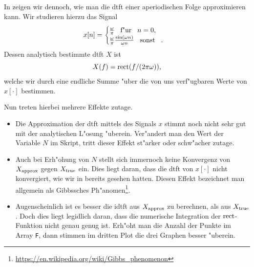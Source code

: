 In  zeigen wir dennoch, wie man die \gls{dtft} einer aperiodischen Folge approximieren kann.
Wir studieren hierzu das Signal
\[
x[n] = \begin{cases}
    \frac{\omega}{\pi} {\hspace{3mm} \text{f"ur} \hspace{3mm}} n = 0,\\
    \frac{\omega}{\pi} \frac{\sin(\omega n)}{\omega n} {\hspace{3mm} \text{sonst} \hspace{3mm}}.
\end{cases}
\]
Dessen analytisch bestimmte \gls{dtft} $X$ ist
\[
X(f) = \operatorname*{rect}(f/(2 \pi \omega)),
\]
welche wir durch eine endliche Summe "uber die von uns verf"ugbaren Werte von $x[\cdot]$ bestimmen.

Nun treten hierbei mehrere Effekte zutage.
%
\begin{itemize}
\item Die Approximation der \gls{dtft} mittels des  Signals $x$ stimmt noch nicht sehr gut mit der analytischen L"osung "uberein. 
Ver"andert man den Wert der Variable $N$ im Skript, tritt dieser Effekt st"arker oder schw"acher zutage.
\item Auch bei Erh"ohung von $N$ stellt sich immernoch keine Konvergenz von $X_{\rm approx}$ gegen $X_{\rm true}$ ein.
Dies liegt daran, dass die \gls{dtft} von $x[\cdot]$ nicht konvergiert, wie wir in  bereits gesehen hatten.
Diesen Effekt bezeichnet man allgemein als Gibbssches Ph"anomen\footnote{\url{https://en.wikipedia.org/wiki/Gibbs_phenomenon}}.
\item Augenscheinlich ist es besser die \gls{idtft} aus $X_{\rm approx}$ zu berechnen, als aus $X_{\rm true}$. Doch dies liegt legidlich daran, dass die numerische Integration der $\operatorname*{rect}$-Funktion nicht genau genug ist.
Erh"oht man die Anzahl der Punkte im Array \texttt{F}, dann stimmen im dritten Plot die drei Graphen besser "uberein.
\end{itemize}
%

